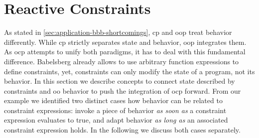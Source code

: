 

\section{Reactive Constraints}
As stated in \autoref{sec:application-bbb-shortcomings}, \gls{cp} and \gls{oop} treat behavior differently. While \gls{cp} strictly separates state and behavior, \gls{oop} integrates them. As \gls{ocp} attempts to unify both paradigms, it has to deal with this fundamental difference. Babelsberg already allows to use arbitrary function expressions to define constraints, yet, constraints can only modify the state of a program, not its behavior.
In this section we describe concepts to connect state described by constraints and \gls{oo} behavior to push the integration of \gls{ocp} forward.
From our example we identified two distinct cases how behavior can be related to constraint expressions: invoke a piece of behavior \emph{as soon as} a constraint expression evaluates to true, and adapt behavior \emph{as long as} an associated constraint expression holds.
In the following we discuss both cases separately.

